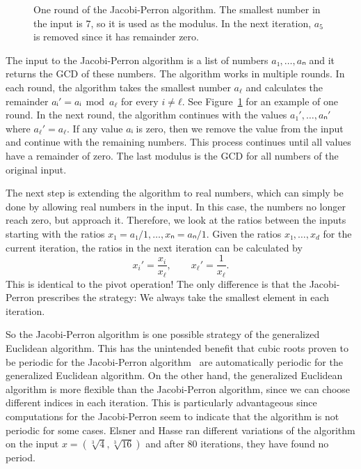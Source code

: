 \begin{figure}[tbp]
  \centering
  
  \caption{
    One round of the Jacobi-Perron algorithm.
    The smallest number in the input is $7$,
    so it is used as the modulus.
    In the next iteration, $a_5$ is removed since it has remainder zero.
  }
  \label{fig:jacobi-perron}
\end{figure}

The input to the Jacobi-Perron algorithm is a list of numbers $a₁, …, aₙ$ and
it returns the GCD of these numbers.
The algorithm works in multiple rounds.
In each round, the algorithm takes the smallest number $a_ℓ$ and calculates the
remainder $aᵢ' = aᵢ \bmod a_ℓ$ for every $i ≠ ℓ$.
See Figure~\ref{fig:jacobi-perron} for an example of one round.
In the next round, the algorithm continues with the values $a₁', …, aₙ'$ where $a_ℓ' = a_ℓ$.
If any value $aᵢ$ is zero, then we remove the value from the input and continue
with the remaining numbers.
This process continues until all values have a remainder of zero.
The last modulus is the GCD for all numbers of the original input.

The next step is extending the algorithm to real numbers,
which can simply be done by allowing real numbers in the input.
In this case, the numbers no longer reach zero, but approach it.
Therefore, we look at the ratios between the inputs starting with the ratios $x₁ = a₁/1, …, xₙ = aₙ/1$.
Given the ratios $x₁, …, x_d$ for the current iteration,
the ratios in the next iteration can be calculated by
\[
  x_i' = \frac{x_i}{x_ℓ}, \qquad x_ℓ' = \frac{1}{x_ℓ}.
\]
This is identical to the pivot operation!
The only difference is that the Jacobi-Perron prescribes the strategy:
We always take the smallest element in each iteration.

So the Jacobi-Perron algorithm is one possible strategy of the generalized
Euclidean algorithm.
This has the unintended benefit that cubic roots proven to be periodic for the
Jacobi-Perron algorithm~\cite{Bernstein64,Bernstein71} are automatically
periodic for the generalized Euclidean algorithm.
On the other hand,
the generalized Euclidean algorithm is more flexible than the Jacobi-Perron
algorithm, since we can choose different indices in each iteration.
This is particularly advantageous since computations for the Jacobi-Perron
seem to indicate that the algorithm is not periodic for some
cases.
Elsner and Hasse \cite{Elsner67} ran different variations of the algorithm on
the input $x = (\sqrt[3]{4}, \sqrt[3]{16})$ and after 80 iterations, they have
found no period.
